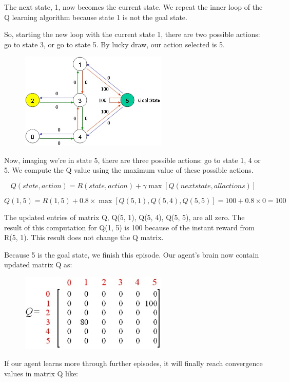 \documentclass[a4paper, 11pt]{article}
\begin{document}
The next state, 1, now becomes the current state.  We repeat the inner loop of the Q learning algorithm because state 1 is not the goal state. 

So, starting the new loop with the current state 1, there are two possible actions: go to state 3, or go to state 5.  By lucky draw, our action selected is 5.

\begin{figure}[ht]
\centering
\includegraphics[width=7cm]{Pic/map3a}
\end{figure}

Now, imaging we're in state 5, there are three possible actions: go to state 1, 4 or 5.  We compute the Q value using the maximum value of these possible actions.

$$Q(state, action) = R(state, action) + \gamma\max[Q(next state, all actions)]$$

$$Q(1, 5) = R(1, 5) + 0.8 \times\max[Q(5, 1), Q(5, 4), Q(5, 5)] = 100 + 0.8\times0 = 100$$

The updated entries of matrix Q, Q(5, 1), Q(5, 4), Q(5, 5), are all zero.  The result of this computation for Q(1, 5) is 100 because of the instant reward from R(5, 1).  This result does not change the Q matrix.

Because 5 is the goal state, we finish this episode.  Our agent's brain now contain updated matrix Q as:

\begin{figure}[ht]
\centering
\includegraphics[width=7cm]{Pic/q_matrix3}
\end{figure}

If our agent learns more through further episodes, it will finally reach convergence values in matrix Q like:
\end{document}

